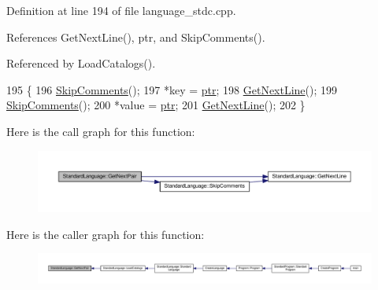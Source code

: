 Definition at line 194 of file language\+\_\+stdc.\+cpp.



References Get\+Next\+Line(), ptr, and Skip\+Comments().



Referenced by Load\+Catalogs().


\begin{DoxyCode}
195 \{
196     \hyperlink{classStandardLanguage_af0078bbe8a06f6e4fb35ddfda1170e19}{SkipComments}();
197     *key = \hyperlink{classStandardLanguage_a4cf91a3b08223744f1ef342b0f98bb3b}{ptr};
198     \hyperlink{classStandardLanguage_a8a4a4a2879f1e907c17f36dfafdebd66}{GetNextLine}();
199     \hyperlink{classStandardLanguage_af0078bbe8a06f6e4fb35ddfda1170e19}{SkipComments}();
200     *value = \hyperlink{classStandardLanguage_a4cf91a3b08223744f1ef342b0f98bb3b}{ptr};
201     \hyperlink{classStandardLanguage_a8a4a4a2879f1e907c17f36dfafdebd66}{GetNextLine}();
202 \}
\end{DoxyCode}


Here is the call graph for this function\+:\nopagebreak
\begin{figure}[H]
\begin{center}
\leavevmode
\includegraphics[width=350pt]{classStandardLanguage_ab1945e2e3503ce12eac28c0d08234cfb_cgraph}
\end{center}
\end{figure}




Here is the caller graph for this function\+:\nopagebreak
\begin{figure}[H]
\begin{center}
\leavevmode
\includegraphics[width=350pt]{classStandardLanguage_ab1945e2e3503ce12eac28c0d08234cfb_icgraph}
\end{center}
\end{figure}



